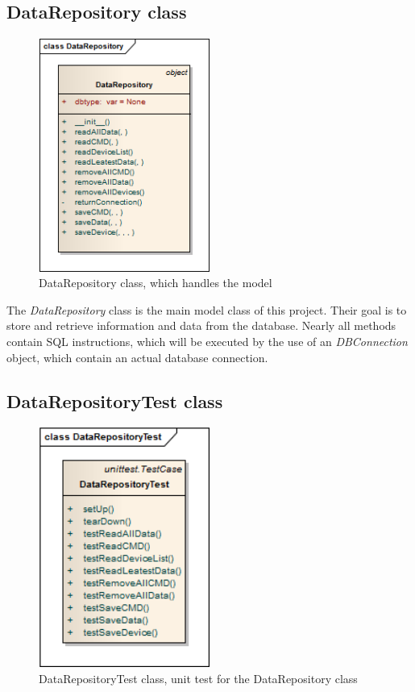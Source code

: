 \subsection{DataRepository class}
\begin{figure}[H]
   \centering
   \includegraphics[width=0.5\textwidth]{pic/DataRepository.png}%
   \caption{DataRepository class, which handles the model}
   \label{DataRepositorypic}%
\end{figure}

The \textit{DataRepository} class is the main model class of this project. 
Their goal is to store and retrieve information and data from the database. 
Nearly all methods contain SQL instructions, 
which will be executed by the use of an \textit{DBConnection} object, which contain an actual database connection.

\newpage
\subsection{DataRepositoryTest class}
\begin{figure}[H]
   \centering
   \includegraphics[width=0.5\textwidth]{pic/DataRepositoryTest.png}%
   \caption{DataRepositoryTest class, unit test for the DataRepository class}
   \label{DataRepositoryTestpic}%
\end{figure}

